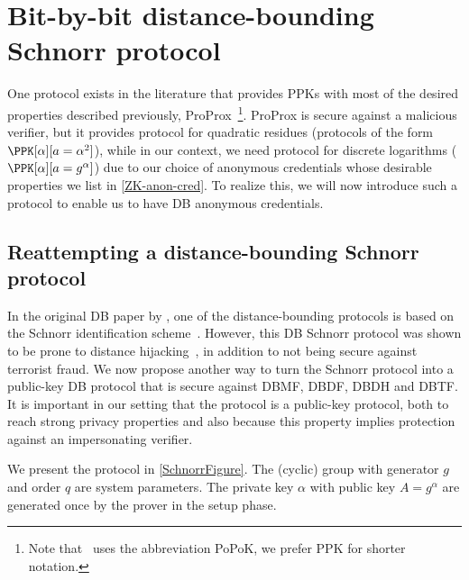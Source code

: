 \section{Bit-by-bit distance-bounding Schnorr protocol}%

One protocol exists in the literature that provides \acp{PPK} with most of the desired properties described previously, ProProx~\cite{ProProx}\footnote{Note that~\cite{ProProx} uses the abbreviation PoPoK, we prefer \acs{PPK} for shorter notation.}.
ProProx is secure against a malicious verifier, but it provides  protocol for quadratic residues (\ie protocols of the form \(\PPK[\alpha][a = 
  \alpha^2]\)), while in our context, we need  protocol for discrete logarithms (\ie \(\PPK[\alpha][a = g^\alpha]\)) due to our choice of anonymous credentials whose desirable properties we list in \cref{ZK-anon-cred}.%
To realize this, we will now introduce such a protocol to enable us to have \ac{DB} anonymous credentials.

\subsection{Reattempting a distance-bounding Schnorr protocol}%
\label{DBSchnorr-n-bit}

In the original \ac{DB} paper by \citet{DistanceBounding}, one of the distance-bounding protocols is based on the Schnorr identification scheme~\cite{Schnorr}.
However, this \ac{DB} Schnorr protocol was shown to be prone to distance hijacking~\cite{DistanceHijacking, TamarinDB}, in addition to not being secure against terrorist fraud.
We now propose another way to turn the Schnorr protocol into a public-key \ac{DB} protocol that is secure against \ac{DBMF}, \ac{DBDF}, \ac{DBDH} and \ac{DBTF}.
It is important in our setting that the protocol is a public-key protocol, both to reach strong privacy properties and also because this property implies protection against an impersonating verifier.

We present the protocol in \cref{SchnorrFigure}.
The (cyclic) group with generator \(g\) and order \(q\) are system parameters.
The private key \(\alpha\) with public key \(A = g^\alpha\) are generated once by the prover in the setup phase.

